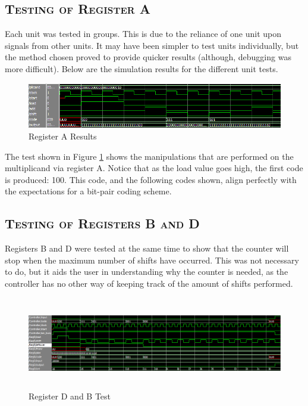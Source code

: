 \documentclass[11pt]{report}
\begin{document}
\begin{spacing}{1.5}
\subsection{\scshape Testing of Register A}
\label{sub:test_piso}

Each unit was tested in groups.  This is due to the reliance of one unit upon signals from other units.  It may have been simpler to test units individually, but the method chosen proved to provide quicker results (although, debugging was more difficult).  Below are the simulation results for the different unit tests.

\vspace{15px}
\begin{figure}[H]
    \centering
    \includegraphics[width=1.0\textwidth,keepaspectratio]{rega_sim.png}
    \caption{Register A Results}
    \label{fig:rega}
\end{figure}

The test shown in Figure \ref{fig:rega} shows the manipulations that are performed on the multiplicand via register A.  Notice that as the load value goes high, the first code is produced: 100.  This code, and the following codes shown, align perfectly with the expectations for a bit-pair coding scheme.

\subsection{\scshape Testing of Registers B and D}
\label{sub:test_counter}

Registers B and D were tested at the same time to show that the counter will stop when the maximum number of shifts have occurred.  This was not necessary to do, but it aids the user in understanding why the counter is needed, as the controller has no other way of keeping track of the amount of shifts performed.

\vspace{15px}
\begin{figure}[H]
    \centering
    \includegraphics[width=1.0\textwidth,height=4cm,keepaspectratio]{reg_d_b.png}
    \caption{Register D and B Test}
    \label{fig:regd_b}
\end{figure}


\end{spacing}
\end{document}
